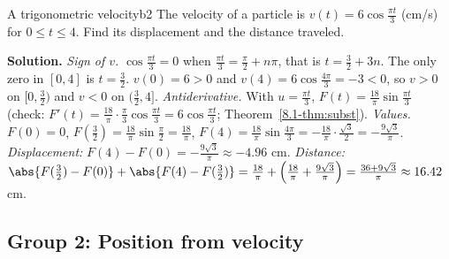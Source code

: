 \documentclass[11pt]{article}
\begin{document}
\begin{exmp}{A trigonometric velocity}{b2}
The velocity of a particle is $v(t)=6\cos\frac{\pi t}3$ (cm/s) for $0\le t\le4$. Find its displacement and the distance traveled.

\textbf{Solution.} \emph{Sign of $v$.} $\cos\frac{\pi t}3=0$ when $\frac{\pi t}3=\frac\pi2+n\pi$, that is $t=\frac32+3n$. The only zero in $[0,4]$ is $t=\frac32$. $v(0)=6>0$ and $v(4)=6\cos\frac{4\pi}3=-3<0$, so $v>0$ on $[0,\frac32)$ and $v<0$ on $(\frac32,4]$.
\emph{Antiderivative.} With $u=\frac{\pi t}3$, $F(t)=\frac{18}\pi\sin\frac{\pi t}3$ (check: $F'(t)=\frac{18}\pi\cdot\frac\pi3\cos\frac{\pi t}3=6\cos\frac{\pi t}3$; Theorem~\ref{8.1-thm:subst}).
\emph{Values.} $F(0)=0$, $F\left(\frac32\right)=\frac{18}\pi\sin\frac\pi2=\frac{18}\pi$, $F(4)=\frac{18}\pi\sin\frac{4\pi}3=-\frac{18}\pi\cdot\frac{\sqrt3}2=-\frac{9\sqrt3}\pi$.
\emph{Displacement:} $F(4)-F(0)=-\frac{9\sqrt3}\pi\approx-4.96$ cm. \emph{Distance:} $\abs{F(\frac32)-F(0)}+\abs{F(4)-F(\frac32)}=\frac{18}\pi+\left(\frac{18}\pi+\frac{9\sqrt3}\pi\right)=\frac{36+9\sqrt3}\pi\approx16.42$ cm.
\end{exmp}

\subsection*{Group 2: Position from velocity}
\end{document}
